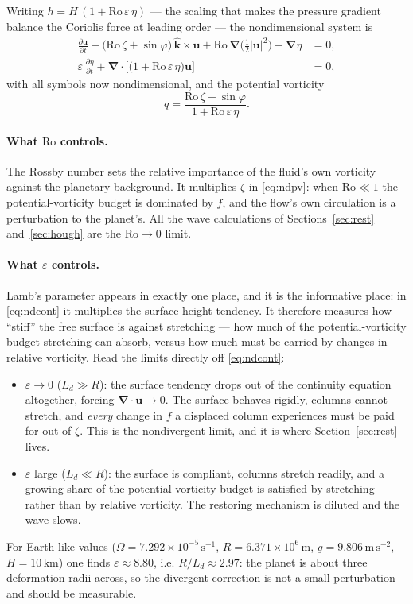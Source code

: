 \documentclass[11pt,a4paper]{article}
\newcommand{\uvec}{\boldsymbol{u}}
\newcommand{\kvec}{\hat{\boldsymbol{k}}}
\newcommand{\grad}{\boldsymbol{\nabla}}
\newcommand{\Ro}{\mathrm{Ro}}
\begin{document}
Writing $h = H\,(1 + \Ro\,\varepsilon\,\eta)$ --- the scaling that makes the
pressure gradient balance the Coriolis force at leading order --- the
nondimensional system is
%
\begin{align}
\frac{\partial\uvec}{\partial t}
  + \big(\Ro\,\zeta + \sin\varphi\big)\,\kvec\times\uvec
  + \Ro\,\grad\big(\tfrac12|\uvec|^2\big) + \grad\eta &= 0 ,
\label{eq:ndmom}\\[2pt]
\varepsilon\,\frac{\partial\eta}{\partial t}
  + \grad\!\cdot\Big[\big(1 + \Ro\,\varepsilon\,\eta\big)\uvec\Big] &= 0 ,
\label{eq:ndcont}
\end{align}
%
with all symbols now nondimensional, and the potential vorticity
%
\begin{equation}
q = \frac{\Ro\,\zeta + \sin\varphi}{1 + \Ro\,\varepsilon\,\eta} .
\label{eq:ndpv}
\end{equation}

\paragraph{What $\Ro$ controls.} The Rossby number sets the relative importance
of the fluid's own vorticity against the planetary background. It multiplies
$\zeta$ in \eqref{eq:ndpv}: when $\Ro \ll 1$ the potential-vorticity budget is
dominated by $f$, and the flow's own circulation is a perturbation to the
planet's. All the wave calculations of Sections~\ref{sec:rest}
and~\ref{sec:hough} are the $\Ro \to 0$ limit.

\paragraph{What $\varepsilon$ controls.} Lamb's parameter appears in exactly one
place, and it is the informative place: in \eqref{eq:ndcont} it multiplies the
surface-height tendency. It therefore measures how ``stiff'' the free surface is
against stretching --- how much of the potential-vorticity budget stretching can
absorb, versus how much must be carried by changes in relative vorticity. Read
the limits directly off \eqref{eq:ndcont}:
%
\begin{itemize}
\item $\varepsilon \to 0$ ($L_d \gg R$): the surface tendency drops out of the
continuity equation altogether, forcing $\grad\!\cdot\uvec \to 0$. The surface
behaves rigidly, columns cannot stretch, and \emph{every} change in $f$ a
displaced column experiences must be paid for out of $\zeta$. This is the
nondivergent limit, and it is where Section~\ref{sec:rest} lives.
\item $\varepsilon$ large ($L_d \ll R$): the surface is compliant, columns
stretch readily, and a growing share of the potential-vorticity budget is
satisfied by stretching rather than by relative vorticity. The restoring
mechanism is diluted and the wave slows.
\end{itemize}
%
For Earth-like values ($\Omega = 7.292\times10^{-5}\,\mathrm{s^{-1}}$,
$R = 6.371\times10^{6}\,\mathrm{m}$, $g = 9.806\,\mathrm{m\,s^{-2}}$,
$H = 10\,\mathrm{km}$) one finds $\varepsilon \approx 8.80$, i.e.
$R/L_d \approx 2.97$: the planet is about three deformation radii across, so
the divergent correction is not a small perturbation and should be measurable.
\end{document}

